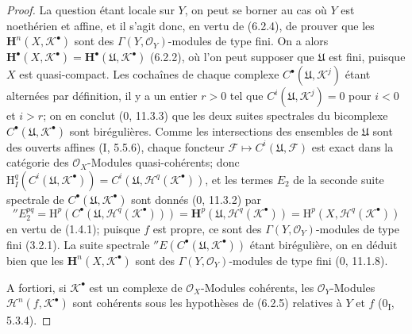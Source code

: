 \begin{proof}
La question étant locale sur $Y$, on peut se borner au cas où $Y$ est
noethérien et affine, et il s'agit donc, en vertu de (6.2.4), de prouver que
les $\mathbf H^n(X,\mathscr K^\bullet)$ sont des
$\Gamma(Y,\mathscr O_Y)$-modules de type fini. On a alors
$\mathbf H^\bullet(X,\mathscr K^\bullet)=
\mathbf H^\bullet(\mathfrak U,\mathscr K^\bullet)$ (6.2.2), où l'on peut
supposer que $\mathfrak U$ est fini, puisque $X$ est quasi-compact. Les
cochaînes de chaque complexe $C^\bullet(\mathfrak U,\mathscr K^j)$ étant
alternées par définition, il y a un entier $r>0$ tel que
$C^i(\mathfrak U,\mathscr K^j)=0$ pour $i<0$ et $i>r$; on en conclut
(0, 11.3.3) que les deux suites spectrales du bicomplexe
$C^\bullet(\mathfrak U,\mathscr K^\bullet)$ sont birégulières. Comme les
intersections des ensembles de $\mathfrak U$ sont des ouverts affines
(I, 5.5.6), chaque foncteur
$\mathscr F\mapsto C^i(\mathfrak U,\mathscr F)$ est exact dans la catégorie
des $\mathscr O_X$-Modules quasi-cohérents; donc
$\mathrm H_I^q(C^i(\mathfrak U,\mathscr K^\bullet))
=C^i(\mathfrak U,\mathscr H^q(\mathscr K^\bullet))$, et les termes
$E_2$ de la seconde suite spectrale de
$C^\bullet(\mathfrak U,\mathscr K^\bullet)$ sont donnés (0, 11.3.2) par
\[
  ''E_2^{pq}
  =\mathrm H^p(C^\bullet(\mathfrak U,\mathscr H^q(\mathscr K^\bullet)))
  =\mathbf H^p(\mathfrak U,\mathscr H^q(\mathscr K^\bullet))
  =\mathrm H^p(X,\mathscr H^q(\mathscr K^\bullet))
\]
en vertu de (1.4.1); puisque $f$ est propre, ce sont des
$\Gamma(Y,\mathscr O_Y)$-modules de type fini (3.2.1). La suite spectrale
$''E(C^\bullet(\mathfrak U,\mathscr K^\bullet))$ étant birégulière, on en
déduit bien que les $\mathbf H^n(X,\mathscr K^\bullet)$ sont des
$\Gamma(Y,\mathscr O_Y)$-modules de type fini (0, 11.1.8).

A fortiori, si $\mathscr K^\bullet$ est un complexe de
$\mathscr O_X$-Modules cohérents, les $\mathscr O_Y$-Modules
$\mathscr H^n(f,\mathscr K^\bullet)$ sont cohérents sous les hypothèses de
(6.2.5) relatives à $Y$ et $f$ (0\textsubscript{I}, 5.3.4).
\end{proof}


